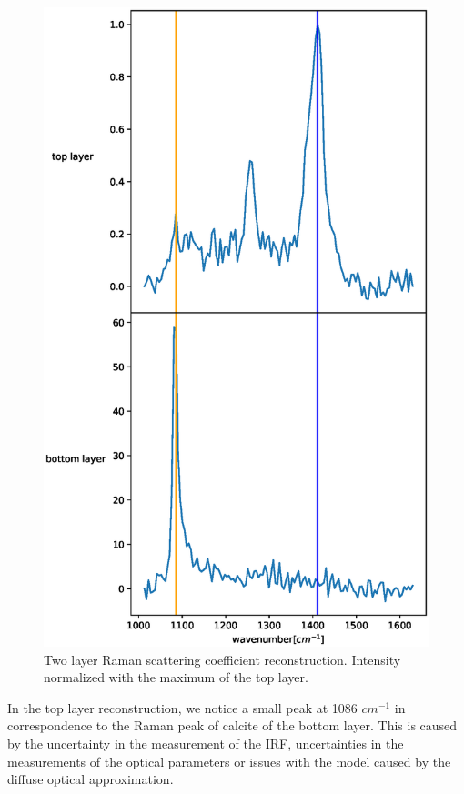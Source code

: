 \documentclass{osa-article}
\begin{document}
\begin{figure}
    \centering
    \includegraphics[scale = 0.4]{figure/recons.eps}
    \caption{Two layer Raman scattering coefficient reconstruction. Intensity normalized with the maximum of the top layer.}
    \label{fig:reconstruction}
\end{figure}
In the top layer reconstruction, we notice a small peak at 1086 $cm^{-1}$ in correspondence to the Raman peak of calcite of the bottom layer. This is caused by the uncertainty in the measurement of the IRF, uncertainties in the measurements of the optical parameters or issues with the model caused by the diffuse optical approximation.
\end{document}
